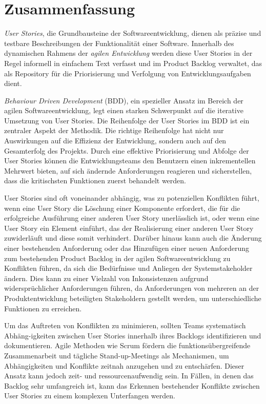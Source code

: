 \newpage
\section*{Zusammenfassung}
\emph{User Stories}, die Grundbausteine der Softwareentwicklung, dienen als präzise und testbare Beschreibungen der Funktionalität einer Software. Innerhalb des dynamischen Rahmens der \emph{agilen Entwicklung} werden diese User Stories in der Regel informell in einfachem Text verfasst und im Product Backlog verwaltet, das als Repository für die Priorisierung und Verfolgung von Entwicklungsaufgaben dient.

\emph{Behaviour Driven Development} (BDD), ein spezieller Ansatz im Bereich der agilen Softwareentwicklung, legt einen starken Schwerpunkt auf die iterative Umsetzung von User Stories. Die Reihenfolge der User Stories im BDD ist ein zentraler Aspekt der Methodik. Die richtige Reihenfolge hat nicht nur Auswirkungen auf die Effizienz der Entwicklung, sondern auch auf den Gesamterfolg des Projekts. Durch eine effektive Priorisierung und Abfolge der User Stories können die Entwicklungsteams den Benutzern einen inkrementellen Mehrwert bieten, auf sich ändernde Anforderungen reagieren und sicherstellen, dass die kritischsten Funktionen zuerst behandelt werden.

User Stories sind oft voneinander abhängig, was zu potenziellen Konflikten führt, wenn eine User Story die Löschung einer Komponente erfordert, die für die erfolgreiche Ausführung einer anderen User Story unerlässlich ist, oder wenn eine User Story ein Element einführt, das der Realisierung einer anderen User Story zuwiderläuft und diese somit verhindert. Darüber hinaus kann auch die Änderung einer bestehenden Anforderung oder das Hinzufügen einer neuen Anforderung zum bestehenden Product Backlog in der agilen Softwareentwicklung zu Konflikten führen, da sich die Bedürfnisse und Anliegen der Systemstakeholder ändern. Dies kann zu einer Vielzahl von Inkonsistenzen aufgrund widersprüchlicher Anforderungen führen, da Anforderungen von mehreren an der Produktentwicklung beteiligten Stakeholdern gestellt werden, um unterschiedliche Funktionen zu erreichen.

Um das Auftreten von Konflikten zu minimieren, sollten Teams systematisch Abhäng-igkeiten zwischen User Stories innerhalb ihres Backlogs identifizieren und dokumentieren. Agile Methoden wie Scrum fördern die funktionsübergreifende Zusammenarbeit und tägliche Stand-up-Meetings als Mechanismen, um Abhängigkeiten und Konflikte zeitnah anzugehen und zu entschärfen. Dieser Ansatz kann jedoch zeit- und ressourcenaufwendig sein. In Fällen, in denen das Backlog sehr umfangreich ist, kann das Erkennen bestehender Konflikte zwischen User Stories zu einem komplexen Unterfangen werden.

